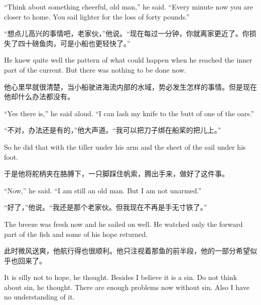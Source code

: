\begin{paracol}{2}
\switchcolumn*

``Think about something cheerful, old man,'' he said. ``Every minute now you
are closer to home. You sail lighter for the loss of forty pounds.''

\switchcolumn

“想点儿高兴的事情吧，老家伙，”他说。“现在每过一分钟，你就离家更近了。你损失了四十磅鱼肉，可是小船也更轻快了。”

\switchcolumn*

He knew quite well the \gls{pattern} of what could happen when he reached
the inner part of the current. But there was nothing to be done now.

\switchcolumn

他心里早就很清楚，当小船驶进海流内部的水域，势必发生怎样的事情。但是现在他却什么办法都没有。

\switchcolumn*

``Yes there is,'' he said aloud. ``I can lash my knife to the \gls{butt} of
one of the oars.''

\switchcolumn

“不对，办法还是有的，”他大声道。“我可以把刀子绑在船桨的把儿上。”

\switchcolumn*

So he did that with the tiller under his arm and the \gls{sheet} of the sail
under his foot.

\switchcolumn

于是他将舵柄夹在胳膊下，一只脚踩住帆索，腾出手来，做好了这件事。

\switchcolumn*

``Now,'' he said. ``I am still an old man. But I am not unarmed.''

\switchcolumn

“好了，”他说。“我还是那个老家伙。但我现在不再是手无寸铁了。”

\switchcolumn*

The breeze was fresh now and he sailed on well. He watched only the forward
part of the fish and some of his hope returned.

\switchcolumn

此时微风送爽，他航行得也很顺利。他只注视着那鱼的前半段，他的一部分希望似乎也回来了。

\switchcolumn*

It is \gls{silly} not to hope, he thought. Besides I believe it is a
\gls{sin}. Do not think about sin, he thought. There are enough problems now
without sin. Also I have no \gls{understanding} of it.


\end{paracol}
